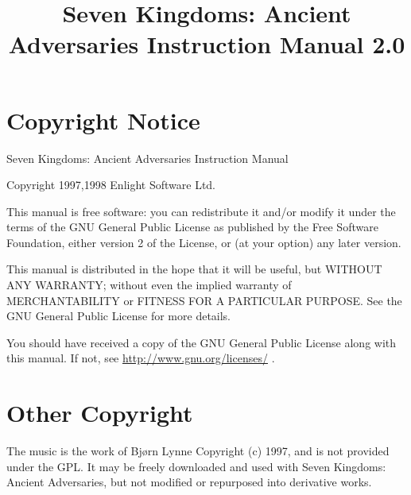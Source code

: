 \documentclass[openany,a4paper,12pt]{book}
\begin{document}
\begin{titlepage}
	\title{Seven Kingdoms: Ancient Adversaries Instruction Manual 2.0}
	\date{}
\end{titlepage}
\frontmatter
\maketitle

\section{Copyright Notice}

Seven Kingdoms: Ancient Adversaries Instruction Manual

Copyright 1997,1998 Enlight Software Ltd.

This manual is free software: you can redistribute it and/or modify it under the terms of the GNU General Public License as published by the Free Software Foundation, either version 2 of the License, or (at your option) any later version.

This manual is distributed in the hope that it will be useful, but WITHOUT ANY WARRANTY; without even the implied warranty of MERCHANTABILITY or FITNESS FOR A PARTICULAR PURPOSE.  See the GNU General Public License for more details.

You should have received a copy of the GNU General Public License along with this manual.  If not, see \href{<http://www.gnu.org/licenses/>}{http://www.gnu.org/licenses/} .

\section{Other Copyright}

The music is the work of Bjørn Lynne Copyright (c) 1997, and is not provided under the GPL. It may be freely downloaded and used with Seven Kingdoms: Ancient Adversaries, but not modified or repurposed into derivative works. 
\end{document}
